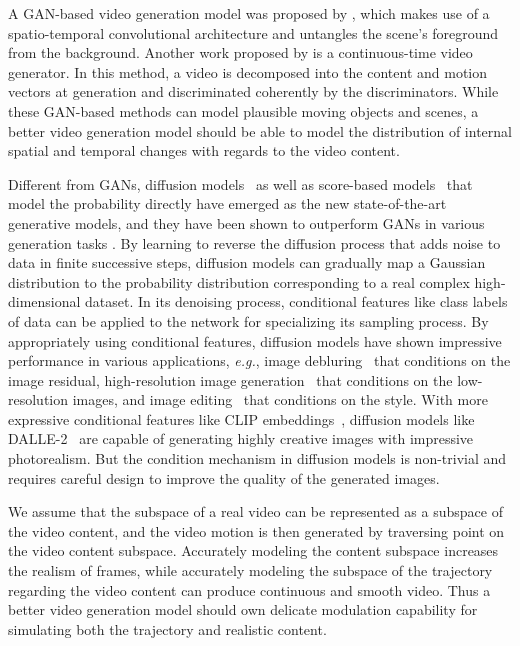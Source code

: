 \documentclass[letterpaper]{article}
\begin{document}
         
         
A GAN-based video generation model was proposed by \citet{vondrick2016generating}, which makes use of a spatio-temporal convolutional architecture and untangles the scene’s foreground from the background.
Another work proposed by \citet{tulyakov2018mocogan} is a continuous-time video generator. In this method, a video is decomposed into the content and motion vectors at generation and discriminated coherently by the discriminators.  While these GAN-based methods can model plausible moving objects and scenes, a better video generation model should be able to model the distribution of internal spatial and temporal changes with regards to the video content.

Different from GANs, diffusion models~\cite{sohl2015deep, ho2020denoising} as well as score-based models~\cite{song2020score} that model the probability directly have emerged as the new state-of-the-art generative models, and they have been shown to outperform GANs in various generation tasks \cite{dhariwal2021diffusion}. By learning to reverse the diffusion process that adds noise to data in finite successive steps, diffusion models can gradually map a Gaussian distribution to the probability distribution corresponding to a real complex high-dimensional dataset.
In its denoising process, conditional features like class labels of data can be applied to the network for specializing its sampling process.
By appropriately using conditional features, diffusion models have shown impressive performance in various applications, \emph{e.g.}, image debluring~\cite{whang2021deblurring} that conditions on the image residual, high-resolution image generation~\cite{ho2022cascaded} that conditions on the low-resolution images, and image editing~\cite{choi2021ilvr} that conditions on the style.
With more expressive conditional features like CLIP embeddings~\cite{radford2021learning}, diffusion models like DALLE-2~\cite{ramesh2022hierarchical} are capable of generating highly creative images with impressive photorealism.
But the condition mechanism in diffusion models is non-trivial and requires careful design to improve the quality of the generated images.

We assume that the subspace of a real video can be represented as a subspace of the video content, and the video motion is then generated by traversing point on the video content subspace.
Accurately modeling the content subspace increases the realism of frames, while accurately modeling the subspace of the trajectory regarding the video content can produce continuous and smooth video.  Thus a  better video generation model should own delicate modulation capability for simulating both the trajectory and realistic content.
\end{document}
